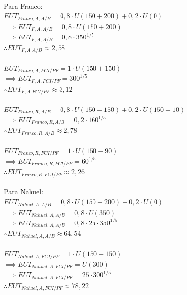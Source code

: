 \documentclass{article}
\begin{document}
      \\
      Para Franco:
      \\
      \(EUT_{Franco, A, A/B} = 0,8 \cdot U(150+200) + 0,2 \cdot U(0)\) \\
      \(\implies EUT_{F, A, A/B} = 0,8 \cdot U(150+200)\) \\
      \(\implies EUT_{F, A, A/B} = 0,8 \cdot 350^{1/5}\) \\
      \(\therefore EUT_{F, A, A/B} \approx 2,58\) \\
      \\
      \(EUT_{Franco, A, FCI/PF} = 1 \cdot U(150+150)\) \\
      \(\implies EUT_{F, A, FCI/PF} = 300^{1/5}\) \\
      \(\therefore EUT_{F, A, FCI/PF} \approx 3,12\) \\
      \\
      \(EUT_{Franco, R, A/B} = 0,8 \cdot U(150-150) + 0,2 \cdot U(150+10)\) \\
      \(\implies EUT_{Franco, R, A/B} = 0,2 \cdot 160^{1/5}\) \\
      \(\therefore EUT_{Franco, R, A/B} \approx 2,78\) \\
      \\
      \(EUT_{Franco, R, FCI/PF} = 1 \cdot U(150-90)\) \\
      \(\implies EUT_{Franco, R, FCI/PF} = 60^{1/5}\) \\
      \(\therefore EUT_{Franco, R, FCI/PF} \approx 2,26\) \\
      \\
      Para Nahuel:
      \\
      \(EUT_{Nahuel, A, A/B} = 0,8 \cdot U(150+200) + 0,2 \cdot U(0)\) \\
      \(\implies EUT_{Nahuel, A, A/B} = 0,8 \cdot U(350)\) \\
      \(\implies EUT_{Nahuel, A, A/B} = 0,8 \cdot 25 \cdot 350^{1/5}\) \\
      \(\therefore EUT_{Nahuel, A, A/B} \approx 64,54\) \\
      \\ 
      \(EUT_{Nahuel, A, FCI/PF} = 1 \cdot U(150 + 150)\) \\
      \(\implies EUT_{Nahuel, A, FCI/PF} = U(300)\) \\
      \(\implies EUT_{Nahuel, A, FCI/PF} = 25 \cdot 300^{1/5}\) \\
      \(\therefore EUT_{Nahuel, A, FCI/PF} \approx 78,22\) \\
      \\
\end{document}
